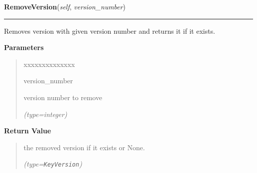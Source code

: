 \hspace{.8\funcindent}\begin{boxedminipage}{\funcwidth}

    \raggedright \textbf{RemoveVersion}(\textit{self}, \textit{version\_number})

    \vspace{-1.5ex}

    \rule{\textwidth}{0.5\fboxrule}
\setlength{\parskip}{2ex}
    Removes version with given version number and returns it if it exists.

\setlength{\parskip}{1ex}
      \textbf{Parameters}
      \vspace{-1ex}

      \begin{quote}
        \begin{Ventry}{xxxxxxxxxxxxxx}

          \item[version\_number]

          version number to remove

            {\it (type=integer)}

        \end{Ventry}

      \end{quote}

      \textbf{Return Value}
    \vspace{-1ex}

      \begin{quote}
      the removed version if it exists or None.

      {\it (type=\texttt{KeyVersion})}

      \end{quote}

    \end{boxedminipage}

    \label{keyczar:keydata:KeyMetadata:GetVersion}

    \vspace{0.5ex}

